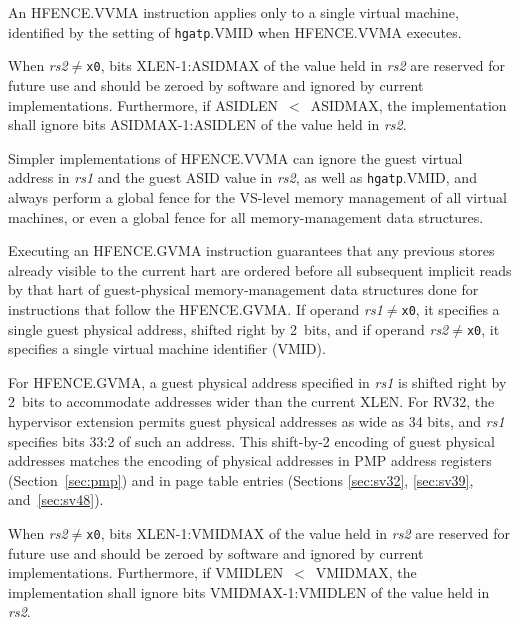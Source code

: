 \begin{commentary}
An HFENCE.VVMA instruction applies only to a single virtual machine, identified
by the setting of {\tt hgatp}.VMID when HFENCE.VVMA executes.
\end{commentary}

When {\em rs2}$\neq${\tt x0}, bits XLEN-1:ASIDMAX of the value held in {\em
rs2} are reserved for future use and should be zeroed by software and ignored
by current implementations.
Furthermore, if ASIDLEN~$<$~ASIDMAX, the implementation shall ignore bits
ASIDMAX-1:ASIDLEN of the value held in {\em rs2}.

\begin{commentary}
Simpler implementations of HFENCE.VVMA can ignore the guest virtual address in
{\em rs1} and the guest ASID value in {\em rs2}, as well as {\tt hgatp}.VMID,
and always perform a global fence for the VS-level memory management of all
virtual machines, or even a global fence for all memory-management data
structures.
\end{commentary}

Executing an HFENCE.GVMA instruction guarantees that any previous stores
already visible to the current hart are ordered before all subsequent implicit
reads by that hart of guest-physical memory-management data structures done for instructions
that follow the HFENCE.GVMA.
If operand {\em rs1}$\neq${\tt x0}, it specifies a single guest physical
address, shifted right by 2~bits, and if operand {\em rs2}$\neq${\tt x0}, it
specifies a single virtual machine identifier (VMID).

\begin{commentary}
For HFENCE.GVMA, a guest physical address specified in {\em rs1} is shifted
right by 2~bits to accommodate addresses wider than the current XLEN.
For RV32, the hypervisor extension permits guest physical addresses as wide as
34 bits, and {\em rs1} specifies bits 33:2 of such an address.
This shift-by-2 encoding of guest physical addresses matches the encoding of
physical addresses in PMP address registers (Section~\ref{sec:pmp}) and in page
table entries (Sections \ref{sec:sv32}, \ref{sec:sv39}, and~\ref{sec:sv48}).
\end{commentary}

When {\em rs2}$\neq${\tt x0}, bits XLEN-1:VMIDMAX of the value held in {\em
rs2} are reserved for future use and should be zeroed by software and ignored
by current implementations.
Furthermore, if VMIDLEN~$<$~VMIDMAX, the implementation shall ignore bits
VMIDMAX-1:VMIDLEN of the value held in {\em rs2}.

